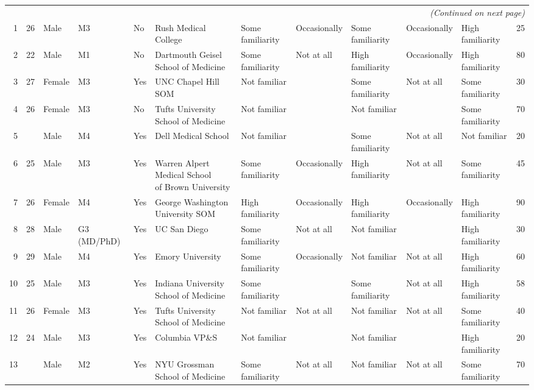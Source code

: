 \documentclass[11pt]{article}
\begin{document}
\begin{landscape}
{\begin{longtable}{rlllllllllll}
\midrule
\multicolumn{12}{r}{\textit{(Continued on next page)}}\\
\endfoot

\bottomrule
\endlastfoot
1 & 26 & Male & M3 & No & Rush Medical College & Some familiarity & Occasionally & Some familiarity & Occasionally & High familiarity & 25 \\
2 & 22 & Male & M1 & No & Dartmouth Geisel School of Medicine & Some familiarity & Not at all & High familiarity & Occasionally & High familiarity & 80 \\
3 & 27 & Female & M3 & Yes & UNC Chapel Hill SOM & Not familiar &  & Some familiarity & Not at all & Some familiarity & 30 \\
4 & 26 & Female & M3 & No & Tufts University School of Medicine & Not familiar &  & Not familiar &  & Some familiarity & 70 \\
5 & \multicolumn{1}{l}{} & Male & M4 & Yes & Dell Medical School & Not familiar &  & Some familiarity & Not at all & Not familiar & 20 \\
6 & 25 & Male & M3 & Yes & \makecell[l]{Warren Alpert Medical School\\ of Brown University} & Some familiarity & Occasionally & High familiarity & Not at all & Some familiarity & 45 \\
7 & 26 & Female & M4 & Yes & George Washington University SOM & High familiarity & Occasionally & High familiarity & Occasionally & High familiarity & 90 \\
8 & 28 & Male & G3 (MD/PhD) & Yes & UC San Diego & Some familiarity & Not at all & Not familiar &  & High familiarity & 30 \\
9 & 29 & Male & M4 & Yes & Emory University & Some familiarity & Occasionally & Not familiar & Not at all & High familiarity & 60 \\
10 & 25 & Male & M3 & Yes & Indiana University School of Medicine & Some familiarity &  & Some familiarity & Not at all & High familiarity & 58 \\
11 & 26 & Female & M3 & Yes & Tufts University School of Medicine & Not familiar & Not at all & Not familiar & Not at all & Some familiarity & 40 \\
12 & 24 & Male & M3 & Yes & Columbia VP\&S & Not familiar &  & Not familiar &  & High familiarity & 20 \\
13 & \multicolumn{1}{l}{} & Male & M2 & Yes & NYU Grossman School of Medicine & Some familiarity & Not at all & Not familiar & Not at all & Some familiarity & 70 \\

\end{longtable}}
\end{landscape}
\end{document}
